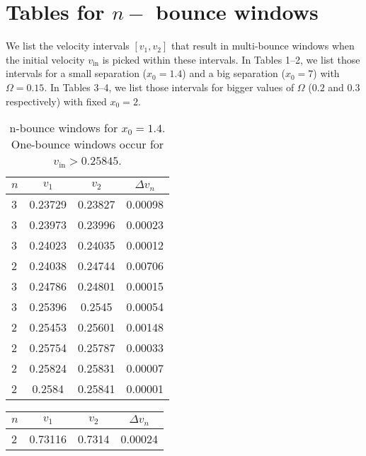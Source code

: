 \documentclass[vecphys]{svmult}		%
\begin{document}
{\appendix
\section{Tables for $n-$ bounce windows}
We list the velocity intervals $[v_1,v_2]$ that result in multi-bounce windows when the initial velocity $v_\mathrm{in}$ is picked within these intervals.  In Tables 1--2,  we list those intervals for a small separation ($x_0=1.4$) and a big separation ($x_0=7$) with $\Omega=0.15$. In Tables 3--4, we list those intervals for bigger values of $\Omega$ ($0.2$ and $0.3$ respectively) with fixed $x_0=2$. 

\begin{table}\label{mb-x0_14}
\begin{center}
{
 \begin{tabular}{|l|c|c|c|}
		\hline
		$n$ & $v_1$ & $v_2$ & $\Delta v_n$ \\
		\hline
		3 & 0.23729 & 0.23827 & 0.00098  \\
		
		3 & 0.23973 &  0.23996 & 0.00023 \\
		3 & 0.24023& 0.24035 & 0.00012 \\

		2 & 0.24038 & 0.24744 & 0.00706 \\
		3 & 0.24786 &0.24801 & 0.00015 \\
		3 & 0.25396 & 0.2545& 0.00054 \\
		2 & 0.25453 & 0.25601 & 0.00148 \\ 
		2 & 0.25754 & 0.25787 & 0.00033 \\
		2 & 0.25824 &0.25831 & 0.00007 \\
		2 & 0.2584 & 0.25841& 0.00001 \\

		
		\hline
	\end{tabular}

\caption{n-bounce windows for $x_0=1.4$. One-bounce windows occur for $v_\mathrm{in}>0.25845$.}
}
\end{center}
\end{table}



\begin{table}\label{mb-x0_7}
\begin{center}
{
\begin{tabular}{|l|c|c|c|}
		\hline
		$n$ & $v_1$ & $v_2$ & $\Delta v_n$ \\
		\hline
		2 & 0.73116 &  0.7314 & 0.00024 \\


\end{tabular}}
\end{center}
\end{table}}
\end{document}
